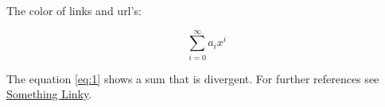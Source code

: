 \documentclass{article}
\begin{document}
The color of links and url's:

\begin{equation}
\label{eq:1}
\sum_{i=0}^{\infty} a_i x^i
\end{equation}

The equation
\ref{eq:1}
shows a sum that is divergent.
For further references see
\href{http://www.overleaf.com}{Something  Linky}. 
\end{document}
